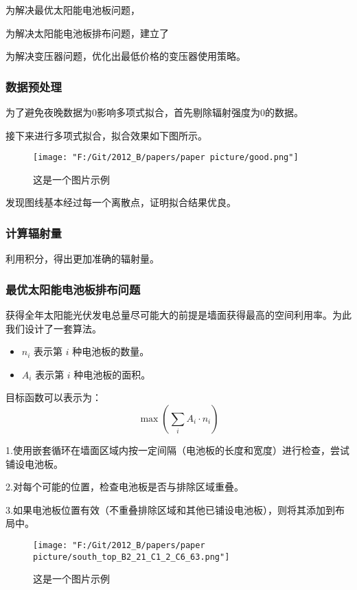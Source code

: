 \documentclass{ctexart}
\begin{document}
    为解决最优太阳能电池板问题，

    为解决太阳能电池板排布问题，建立了

    为解决变压器问题，优化出最低价格的变压器使用策略。
    

    
    \subsubsection{数据预处理}
    为了避免夜晚数据为0影响多项式拟合，首先剔除辐射强度为0的数据。

	接下来进行多项式拟合，拟合效果如下图所示。



	\begin{figure}[H] %
        \centering %
        \texttt{[image: "F:/Git/2012\_B/papers/paper picture/good.png"]} %
        \caption{这是一个图片示例} %
        \label{fig:example} %
    \end{figure}
    发现图线基本经过每一个离散点，证明拟合结果优良。
	\subsubsection{计算辐射量}
	利用积分，得出更加准确的辐射量。

    \subsubsection{最优太阳能电池板排布问题}
获得全年太阳能光伏发电总量尽可能大的前提是墙面获得最高的空间利用率。为此我们设计了一套算法。

\begin{itemize}
    \item $n_i$ 表示第 $i$ 种电池板的数量。
    \item $A_i$ 表示第 $i$ 种电池板的面积。
\end{itemize}

目标函数可以表示为：
\[
\max \left( \sum_{i} A_i \cdot n_i \right)
\]


1.使用嵌套循环在墙面区域内按一定间隔（电池板的长度和宽度）进行检查，尝试铺设电池板。

2.对每个可能的位置，检查电池板是否与排除区域重叠。

3.如果电池板位置有效（不重叠排除区域和其他已铺设电池板），则将其添加到布局中。
    \begin{figure}[H] %
        \centering %
        \texttt{[image: "F:/Git/2012\_B/papers/paper picture/south\_top\_B2\_21\_C1\_2\_C6\_63.png"]} %
        \caption{这是一个图片示例} %
        \label{fig:example} %
    \end{figure}
\end{document}
